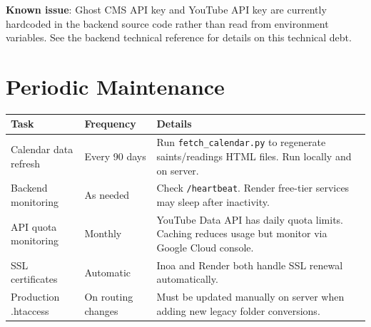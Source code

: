 \documentclass[12pt]{article}
\begin{document}
\textbf{Known issue}: Ghost CMS API key and YouTube API key are currently hardcoded in the backend source code rather than read from environment variables. See the backend technical reference for details on this technical debt.

\section{Periodic Maintenance}

\begin{longtable}{p{3.5cm}p{3cm}p{6cm}}
\toprule
\textbf{Task} & \textbf{Frequency} & \textbf{Details} \\
\midrule
Calendar data refresh & Every 90 days & Run \texttt{fetch\_calendar.py} to regenerate saints/readings HTML files. Run locally and on server. \\
\midrule
Backend monitoring & As needed & Check \texttt{/heartbeat}. Render free-tier services may sleep after inactivity. \\
\midrule
API quota monitoring & Monthly & YouTube Data API has daily quota limits. Caching reduces usage but monitor via Google Cloud console. \\
\midrule
SSL certificates & Automatic & Inoa and Render both handle SSL renewal automatically. \\
\midrule
Production .htaccess & On routing changes & Must be updated manually on server when adding new legacy folder conversions. \\
\bottomrule
\end{longtable}
\end{document}
